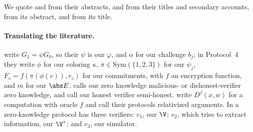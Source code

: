 \begin{refsection}
We quote \textcite{Fortnow1987} and \textcite{GoldreichKrawczyk1996} from their abstracts, \textcite{AielloHastad1991} and \textcite{BenOrEtAl1988} from their titles and secondary accounts, \textcite{SouthEtAl2024} from its abstract, and \textcite{ShamsabadiEtAl2023} from its title.

\paragraph{Translating the literature.} \Textcite{GoldreichMicaliWigderson1991} write $G_1=\psi G_0$, so their $\psi$ is our $\varphi$, and $\alpha$ for our challenge $b_j$; in Protocol~4 they write $\phi$ for our coloring $\kappa$, $\pi\in\mathrm{Sym}(\{1,2,3\})$ for our $\psi_j$, $F_v=f(\pi(\phi(v)),r_v)$ for our commitments, with $f$ an encryption function, and $m$ for our $\abs E$. \Textcite{Thaler2022} calls our zero knowledge malicious- or dishonest-verifier zero knowledge, and \textcite{SunLiZhang2024} call our honest verifier semi-honest. \Textcite{ChiesaGuanYildiz2026} write $D^f(x,w)$ for a computation with oracle $f$ and call their protocols relativized arguments. In \textcite{HammondAdamDay2025} a zero-knowledge protocol has three verifiers: $v_1$, our $\V$; $v_2$, which tries to extract information, our $\V^*$; and $v_3$, our simulator.

\printchapterbib
\end{refsection}
